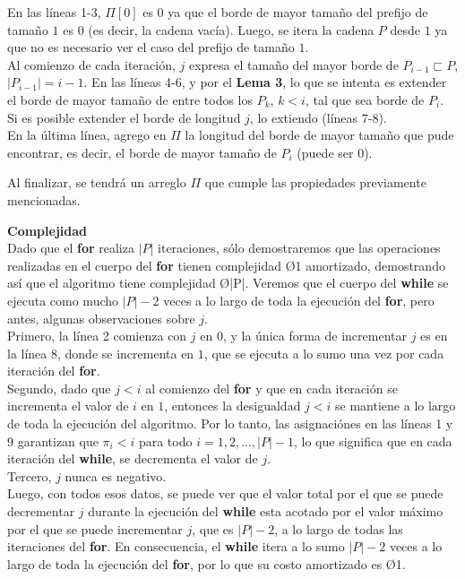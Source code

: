 En las líneas 1-3, $\Pi[0]$ es $0$ ya que el borde de mayor tamaño del prefijo de tamaño $1$ es $0$ (es decir, la cadena vacía). Luego, se itera la cadena $P$ desde $1$ ya que no es necesario ver el caso del prefijo de tamaño $1$.\\
Al comienzo de cada iteración, $j$ expresa el tamaño del mayor borde de $P_{i-1} \sqsubset P$, $|P_{i-1}| = i-1$.
En las líneas 4-6, y por el \textbf{Lema 3}, lo que se intenta es extender el borde de mayor tamaño de entre todos los $P_{k}$, $k < i$, tal que sea borde de $P_i$.\\
Si es posible extender el borde de longitud $j$, lo extiendo (líneas 7-8).\\
En la última línea, agrego en $\Pi$ la longitud del borde de mayor tamaño que pude encontrar, es decir, el borde de mayor tamaño de $P_i$ (puede ser $0$).

Al finalizar, se tendrá un arreglo $\Pi$ que cumple las propiedades previamente mencionadas.\\
\strut\hfill\qedsymbol

\textbf{Complejidad}\\
Dado que el \textbf{for} realiza $|P|$ iteraciones, sólo demostraremos que las operaciones realizadas en el cuerpo del \textbf{for} tienen complejidad \O{1} amortizado, demostrando así que el algoritmo tiene complejidad \O{|P|}.
Veremos que el cuerpo del \textbf{while} se ejecuta como mucho $|P|-2$ veces a lo largo de toda la ejecución del \textbf{for}, pero antes, algunas observaciones sobre $j$.\\
Primero, la línea 2 comienza con $j$ en $0$, y la única forma de incrementar $j$ es en la línea 8, donde se incrementa en $1$, que se ejecuta a lo sumo una vez por cada iteración del \textbf{for}.\\
Segundo, dado que $j < i$ al comienzo del \textbf{for} y que en cada iteración se incrementa el valor de $i$ en $1$, entonces la desigualdad $j < i$ se mantiene a lo largo de toda la ejecución del algoritmo. Por lo tanto, las asignaciónes en las líneas 1 y 9 garantizan que $\pi_i < i$ para todo $i = 1,2,...,|P|-1$, lo que significa que en cada iteración del \textbf{while}, se decrementa el valor de $j$.\\
Tercero, $j$ nunca es negativo.\\
Luego, con todos esos datos, se puede ver que el valor total por el que se puede decrementar $j$ durante la ejecución del \textbf{while} esta acotado por el valor máximo por el que se puede incrementar $j$, que es $|P|-2$, a lo largo de todas las iteraciones del \textbf{for}.
En consecuencia, el \textbf{while} itera a lo sumo $|P|-2$ veces a lo largo de toda la ejecución del \textbf{for}, por lo que su costo amortizado es \O{1}.

